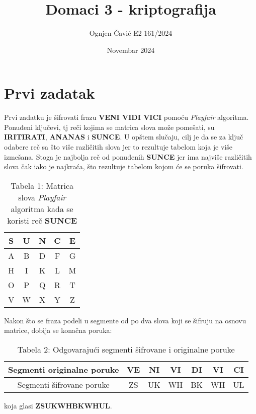 \documentclass[12pt]{article}
\title{Domaci 3 - kriptografija}
\author{Ognjen Čavić E2 161/2024}
\date{Novembar 2024}
\begin{document}
\maketitle
\section{Prvi zadatak}
\par Prvi zadatku je šifrovati frazu \textbf{VENI VIDI VICI} pomoću
\textit{Playfair} algoritma.
Ponuđeni ključevi, tj reči kojima se matrica slova može pomešati, su
\textbf{IRITIRATI}, \textbf{ANANAS} i \textbf{SUNCE}.
U opštem slučaju, cilj je da se za ključ odabere reč sa što više različitih slova
jer to rezultuje tabelom koja je više izmešana.
Stoga je najbolja reč od ponuđenih \textbf{SUNCE} jer ima najviše različitih
slova čak iako je najkraća, što rezultuje tabelom kojom će se poruka šifrovati.
\begin{center}
\begin{table}[h]
	\centering
    \begin{tabular}{|c|c|c|c|c|}
        \hline
		S & U & N & C & E \\
		\hline
		A & B & D & F & G \\
		\hline
		H & I & K & L & M \\
		\hline
		O & P & Q & R & T \\
		\hline
		V & W & X & Y & Z \\
		\hline
    \end{tabular}
	\caption*{Tabela 1: Matrica slova \textit{Playfair} algoritma kada se
	koristi reč \textbf{SUNCE}}
\end{table}
\end{center}
Nakon što se fraza podeli u segmente od po dva slova koji se šifruju na osnovu
matrice, dobija se konačna poruka:
\begin{center}
\begin{table}[ht]
    \centering
    \begin{tabular}{|c|c|c|c|c|c|c|}
		\hline
		Segmenti originalne poruke & VE & NI & VI & DI & VI & CI \\
		\hline
		Segmenti šifrovane poruke & ZS & UK & WH & BK & WH & UL \\
		\hline
    \end{tabular}
	\caption*{Tabela 2: Odgovarajući segmenti šifrovane i originalne poruke}
\end{table}
\end{center}
koja glasi \textbf{ZSUKWHBKWHUL}.
\newpage
\end{document}
